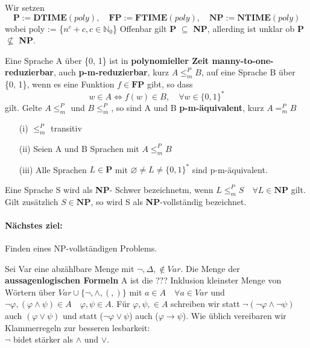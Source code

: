 {}

    Wir setzen 
    \[
        \textbf{P} := \textbf{DTIME} (poly),\quad \textbf{FP} := \textbf{FTIME}(poly),\quad \textbf{NP} := \textbf{NTIME}(poly)   
    \]
    wobei poly := \{\(n^c + c, c \in \mathbb{N}_0\)\}
    Offenbar gilt \textbf{P} \(\subseteq\) \textbf{NP}, allerding ist unklar ob \textbf{P} \(\not \subseteq\) \textbf{NP}.

    Eine Sprache A über \{0, 1\} ist in \textbf{polynomieller Zeit manny-to-one- reduzierbar}, auch \textbf{p-m-reduzierbar}, kurz \(A \leq^P_m B\), auf eine Sprache B über \{0, 1\}, wenn es eine Funktion \(f \in\textbf{FP}\) gibt, so dass 
    \[
        w\in A \Leftrightarrow f (w) \in B, \quad \forall w \in \{0, 1\}^*  
    \] 
    gilt. Gelte \(A \leq^P_m\) und \(B \leq^P_m\), so sind A und B \textbf{p-m-äquivalent}, kurz \(A=^P_m B\)

    \begin{itemize}
        \item [(i)] \(\leq^P_m\) transitiv
        \item [(ii)] Seien A und B Sprachen mit \(A \leq ^P_m B\)
        \item [(iii)] Alle Sprachen \(L \in \textbf{P}\) mit \(\varnothing \not = L \not = \{0,1\}^*\) sind p-m-äquivalent.
    \end{itemize}

    Eine Sprache S wird als \textbf{NP}- Schwer bezeichnetm, wenn \(L \leq ^P_m S \quad \forall L \in \textbf{NP}\) gilt. Gilt zusätzlich \(S \in \textbf{NP}\), so wird S als \textbf{NP}-vollständig bezeichnet.

    \paragraph*{Nächstes ziel:} 
        Finden eines NP-vollständigen Problems.

    Sei Var eine abzählbare Menge mit \(\lnot, \Delta, \not \in Var\). Die Menge der \textbf{aussagenlogischen Formeln} A ist die ??? Inklusion kleinster Menge von Wörtern über \(Var \cup \{\lnot, \wedge, (,)\}\) mit \(a \in A \quad \forall a \in Var\) und \(\lnot \varphi, (\varphi \wedge \psi) \in A \quad \varphi, \psi \in A\). Für \(\varphi, \psi, \in A\) schreiben wir statt \(\lnot(\lnot \varphi \wedge \lnot \psi)\) auch \((\varphi \vee \psi)\) und statt (\(\lnot \varphi \vee \psi\)) auch (\(\varphi \to \psi\)). Wie üblich vereibaren wir Klammerregeln zur besseren lesbarkeit: \\ \(\lnot\) bidet stärker als \(\wedge\) und \(\vee\). 
